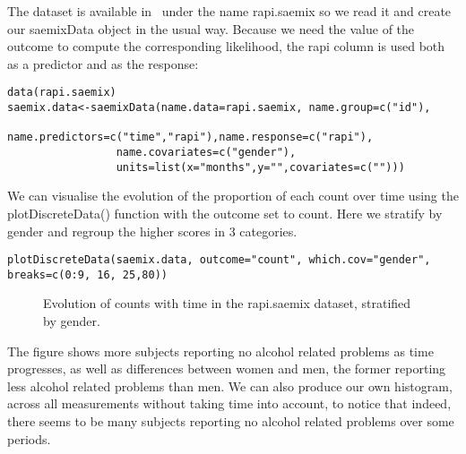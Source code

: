 The dataset is available in \monolix~under the name {\sf rapi.saemix} so we read it and create our saemixData object in the usual way. Because we need the value of the outcome to compute the corresponding likelihood, the {\sf rapi} column is used both as a predictor and as the response:
\begin{verbatim}
data(rapi.saemix)
saemix.data<-saemixData(name.data=rapi.saemix, name.group=c("id"),
                 name.predictors=c("time","rapi"),name.response=c("rapi"),
                 name.covariates=c("gender"),
                 units=list(x="months",y="",covariates=c("")))
\end{verbatim}

We can visualise the evolution of the proportion of each count over time using the {\sf plotDiscreteData()} function with the outcome set to {\sf count}. Here we stratify by gender and regroup the higher scores in 3 categories.
\begin{verbatim}
plotDiscreteData(saemix.data, outcome="count", which.cov="gender", breaks=c(0:9, 16, 25,80))
\end{verbatim}
\begin{figure}[!h]
\begin{center}
\end{center}
\par \kern -0.5cm
\caption{Evolution of counts with time in the {\sf rapi.saemix} dataset, stratified by gender.} \label{fig:rapiData}
\end{figure}
The figure shows more subjects reporting no alcohol related problems as time progresses, as well as differences between women and men, the former reporting less alcohol related problems than men. We can also produce our own histogram, across all measurements without taking time into account, to notice that indeed, there seems to be many subjects reporting no alcohol related problems over some periods. 

